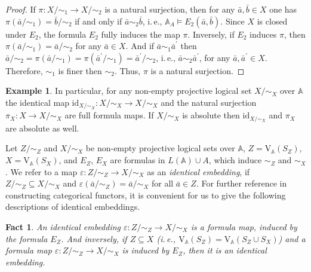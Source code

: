 \documentclass[12pt]{article}
\newtheorem{fact}{Fact}
\theoremstyle{definition}
\newtheorem{example}{Example}
\def\MA{{\mathbb{A}}}
\def\id{{\mathrm{id}}}
\def\V{{\mathrm{V}}}
\begin{document}
\begin{proof}
If $\pi\colon X/{\sim_1}\to X/{\sim_2}$ is a natural surjection, then for any $\bar a,\bar b\in X$ one has $\pi(\bar a/{\sim_1})=\bar b/{\sim_2}$ if and only if $\bar a\sim_2 \bar b$, i.\,e., $\MA_A\models E_2(\bar a,\bar b)$. Since $X$ is closed under $E_2$, the formula $E_2$ fully induces the map $\pi$. Inversely, if $E_2$ induces $\pi$, then $\pi(\bar a/{\sim_1})=\bar a/{\sim_2}$ for any $\bar a\in X$. And if $\bar a\sim_1\bar a^\prime$ then $\bar a/{\sim_2}=\pi(\bar a/{\sim_1})=\pi(\bar a^\prime/{\sim_1})=\bar a^\prime/{\sim_2}$, i.\,e., $\bar a\sim_2\bar a^\prime$, for any $\bar a,\bar a^\prime\in X$. Therefore, $\sim_1$ is finer then $\sim_2$. Thus, $\pi$ is a natural surjection.
\end{proof}

\begin{example}\label{cor:id}
In particular, for any non-empty projective logical set $X/{\sim_X}$ over $\MA$ the identical map $\id_{X/{\sim_X}}\colon X/{\sim_X}\to X/{\sim_X}$ and the natural surjection $\pi_X\colon X\to X/{\sim_X}$ are full formula maps. If $X/{\sim_X}$ is absolute then $\id_{X/{\sim_X}}$ and $\pi_X$ are absolute as well.
\end{example}

Let $Z/{\sim_Z}$ and $X/{\sim_X}$ be non-empty projective logical sets over $\MA$, $Z=\V_\MA(S_Z)$, $X=\V_\MA(S_X)$, and $E_Z$, $E_X$ are formulas in $L(\MA)\cup A$, which induce $\sim_Z$ and $\sim_X$. We refer to a map $\varepsilon\colon Z/{\sim_Z}\to X/{\sim_X}$ as an {\em identical embedding}, if $Z/{\sim_Z}\subseteq X/{\sim_X}$ and $\varepsilon(\bar a/{\sim_Z})=\bar a/{\sim_X}$ for all $\bar a\in Z$. For further reference in constructing categorical functors, it is convenient for us to give the following descriptions of identical embeddings.

\begin{fact}\label{fact:subset}
An identical embedding $\varepsilon\colon Z/{\sim_Z}\to X/{\sim_X}$ is a formula map,  induced by the formula $E_Z$. And inversely, if $Z\subseteq X$ (i.\,e., $\V_\MA(S_Z)= \V_\MA(S_Z\cup S_X)$) and a formula map $\varepsilon\colon Z/{\sim_Z}\to X/{\sim_X}$ is induced by $E_Z$, then it is an identical embedding.
\end{fact}
\end{document}
